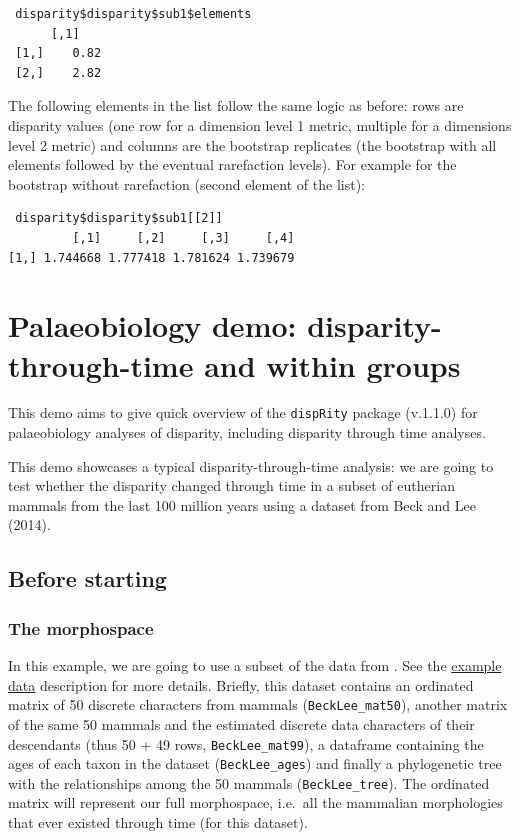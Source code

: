 \documentclass[]{book}
\theoremstyle{definition}
\theoremstyle{definition}
\theoremstyle{remark}
\begin{document}
\begin{verbatim}
 disparity$disparity$sub1$elements
      [,1]
 [1,]    0.82
 [2,]    2.82
\end{verbatim}

The following elements in the list follow the same logic as before: rows
are disparity values (one row for a dimension level 1 metric, multiple
for a dimensions level 2 metric) and columns are the bootstrap
replicates (the bootstrap with all elements followed by the eventual
rarefaction levels). For example for the bootstrap without rarefaction
(second element of the list):

\begin{verbatim}
 disparity$disparity$sub1[[2]]
         [,1]     [,2]     [,3]     [,4]
[1,] 1.744668 1.777418 1.781624 1.739679 
\end{verbatim}

\chapter{Palaeobiology demo: disparity-through-time and within
groups}\label{palaeobiology-demo-disparity-through-time-and-within-groups}

This demo aims to give quick overview of the \texttt{dispRity} package
(v.1.1.0) for palaeobiology analyses of disparity, including disparity
through time analyses.

This demo showcases a typical disparity-through-time analysis: we are
going to test whether the disparity changed through time in a subset of
eutherian mammals from the last 100 million years using a dataset from
Beck and Lee (2014).

\section{Before starting}\label{before-starting}

\subsection{The morphospace}\label{the-morphospace}

In this example, we are going to use a subset of the data from
\citet{beckancient2014}. See the
\protect\hyperlink{example-data}{example data} description for more
details. Briefly, this dataset contains an ordinated matrix of 50
discrete characters from mammals (\texttt{BeckLee\_mat50}), another
matrix of the same 50 mammals and the estimated discrete data characters
of their descendants (thus 50 + 49 rows, \texttt{BeckLee\_mat99}), a
dataframe containing the ages of each taxon in the dataset
(\texttt{BeckLee\_ages}) and finally a phylogenetic tree with the
relationships among the 50 mammals (\texttt{BeckLee\_tree}). The
ordinated matrix will represent our full morphospace, i.e.~all the
mammalian morphologies that ever existed through time (for this
dataset).
\end{document}
